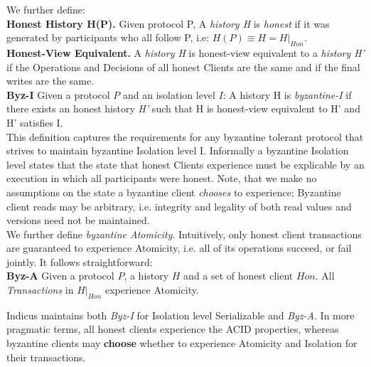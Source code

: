 We further define:\\
\textbf{Honest History H(P).} Given protocol P, A \textit{history H} is \textit{honest} if it was generated by participants who all follow P, i.e: $H(P) \equiv H = H|_{Hon}$.\\
\textbf{Honest-View Equivalent.} A \textit{history H} is honest-view equivalent to a \textit{history H'} if the Operations and Decisions of all honest Clients are the same and if the final writes are the same.\\
\textbf{Byz-I} Given a protocol $P$ and an isolation level $I$:
A history H is \textit{byzantine-I} if there exists an honest history \textit{H'} such that H is honest-view equivalent to H' and H' satisfies I. \\

This definition captures the requirements for any byzantine tolerant protocol that strives to maintain byzantine Isolation level I.
Informally a byzantine Isolation level states that the state that honest Clients experience must be explicable by an execution in which all participants were honest. Note, that we make no assumptions on the state a byzantine client \textit{chooses} to experience; Byzantine client reads may be arbitrary, i.e. integrity and legality of both read values and versions need not be maintained. \\
We further define \textit{byzantine Atomicity}. Intuitively, only honest client transactions are guaranteed to experience Atomicity, i.e. all of its operations succeed, or fail jointly. It follows straightforward:\\
\textbf{Byz-A} Given a protocol $P$, a history $H$ and a set of honest client $Hon$. All \textit{Transactions} in $H|_{Hon}$ experience Atomicity.\\

Indicus maintains both \textit{Byz-I} for Isolation level Serializable and \textit{Byz-A}. 
In more pragmatic terms, all honest clients experience the ACID properties, whereas byzantine clients may \textbf{choose} whether to experience Atomicity and Isolation for their transactions.

